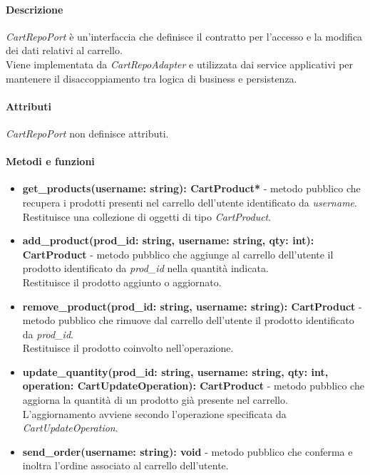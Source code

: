 \paragraph{Descrizione}
\textit{CartRepoPort} \`e un'interfaccia che definisce il contratto per l'accesso e la modifica dei dati relativi al carrello.\\
Viene implementata da \textit{CartRepoAdapter} e utilizzata dai service applicativi per mantenere il disaccoppiamento tra logica di business e persistenza.

\paragraph{Attributi}
\textit{CartRepoPort} non definisce attributi.

\paragraph{Metodi e funzioni}
\begin{itemize}
	\item \textbf{get\_products(username: string): CartProduct*} - metodo pubblico che recupera i prodotti presenti nel carrello dell'utente identificato da \textit{username}.\\
	Restituisce una collezione di oggetti di tipo \textit{CartProduct}.
	\item \textbf{add\_product(prod\_id: string, username: string, qty: int): CartProduct} - metodo pubblico che aggiunge al carrello dell'utente il prodotto identificato da \textit{prod\_id} nella quantit\`a indicata.\\
	Restituisce il prodotto aggiunto o aggiornato.
	\item \textbf{remove\_product(prod\_id: string, username: string): CartProduct} - metodo pubblico che rimuove dal carrello dell'utente il prodotto identificato da \textit{prod\_id}.\\
	Restituisce il prodotto coinvolto nell'operazione.
	\item \textbf{update\_quantity(prod\_id: string, username: string, qty: int, operation: CartUpdateOperation): CartProduct} - metodo pubblico che aggiorna la quantit\`a di un prodotto gi\`a presente nel carrello.\\
	L'aggiornamento avviene secondo l'operazione specificata da \textit{CartUpdateOperation}.
	\item \textbf{send\_order(username: string): void} - metodo pubblico che conferma e inoltra l'ordine associato al carrello dell'utente.
\end{itemize}

